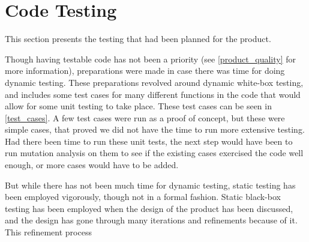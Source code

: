\section{Code Testing}
This section presents the testing that had been planned for the product. 

Though having testable code has not been a priority (see \autoref{product_quality} for more information), preparations were made in case there was time for doing dynamic testing. 
These preparations revolved around dynamic white-box testing, and includes some test cases for many different functions in the code that would allow for some unit testing to take place. 
These test cases can be seen in \autoref{test_cases}. 
A few test cases were run as a proof of concept, but these were simple cases, that proved we did not have the time to run more extensive testing. \newline
Had there been time to run these unit tests, the next step would have been to run mutation analysis on them to see if the existing cases exercised the code well enough, or more cases would have to be added. \newline

But while there has not been much time for dynamic testing, static testing has been employed vigorously, though not in a formal fashion. 
Static black-box testing has been employed when the design of the product has been discussed, and the design has gone through many iterations and refinements because of it. 
This refinement process 